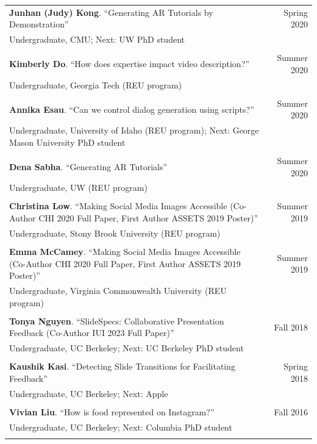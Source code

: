 \begin{longtable}{Xr}
	\textbf{Junhan (Judy) Kong}. ``Generating AR Tutorials by Demonstration'' & Spring 2020 \\
	Undergraduate, CMU; Next: UW PhD student &  \\
	\\

	\textbf{Kimberly Do}. ``How does expertise impact video description?'' & Summer 2020 \\
	Undergraduate, Georgia Tech (REU program) &  \\
	\\

	\textbf{Annika Esau}. ``Can we control dialog generation using scripts?'' & Summer 2020 \\
	Undergraduate, University of Idaho (REU program); Next: George Mason University PhD student &  \\
	\\

	\textbf{Dena Sabha}. ``Generating AR Tutorials'' & Summer 2020 \\
	Undergraduate, UW (REU program) &  \\
	\\

	\textbf{Christina Low}. ``Making Social Media Images Accessible (Co-Author CHI 2020 Full Paper, First Author ASSETS 2019 Poster)'' & Summer 2019 \\
	Undergraduate, Stony Brook University (REU program) &  \\
	\\

	\textbf{Emma McCamey}. ``Making Social Media Images Accessible (Co-Author CHI 2020 Full Paper, First Author ASSETS 2019 Poster)'' & Summer 2019 \\
	Undergraduate, Virginia Commonwealth University (REU program) &  \\
	\\

	\textbf{Tonya Nguyen}. ``SlideSpecs: Collaborative Presentation Feedback (Co-Author IUI 2023 Full Paper)'' & Fall 2018 \\
	Undergraduate, UC Berkeley; Next: UC Berkeley PhD student &  \\
	\\

	\textbf{Kaushik Kasi}. ``Detecting Slide Transitions for Facilitating Feedback'' & Spring 2018 \\
	Undergraduate, UC Berkeley; Next: Apple &  \\
	\\

	\textbf{Vivian Liu}. ``How is food represented on Instagram?'' & Fall 2016 \\
	Undergraduate, UC Berkeley; Next: Columbia PhD student &  \\
	\\

\end{longtable}